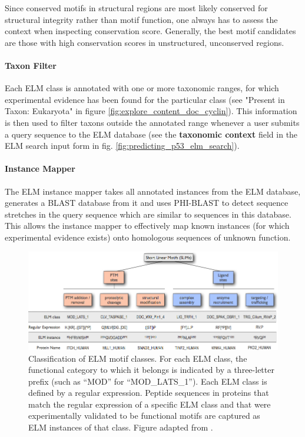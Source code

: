 \documentclass[12pt]{article}
\newcommand\button[1]{%
	\textbf{#1}%
}
\begin{document}
Since conserved motifs in structural regions are most likely conserved for
structural integrity rather than motif function, one always has to assess the
context when inspecting conservation score. Generally, the best motif candidates
are those with high conservation scores in unstructured, unconserved
regions.


\paragraph*{Taxon Filter}\label{TaxonFilter}

Each ELM class is annotated with one or more taxonomic ranges, for which
experimental evidence has been found for the particular class
(see "Present in Taxon: Eukaryota" in figure
\ref{fig:explore_content_doc_cyclin}). This information is then used to filter taxons
outside the annotated range whenever a user submits a query sequence to the ELM
database (see the \button{taxonomic context} field in the ELM search input form in fig.
\ref{fig:predicting_p53_elm_search}).

\paragraph*{Instance Mapper}\label{InstanceMapper}

The ELM instance mapper takes all annotated instances from the ELM database,
generates a BLAST database from it and uses PHI-BLAST \citep{9705509}
to detect sequence stretches in
the query sequence which are similar to sequences in this database. This allows
the instance mapper to effectively map known instances (for which experimental
evidence exists) onto homologous sequences of unknown function.

\begin{figure}[h!]
\centering
\includegraphics[width=\textwidth]{Figures/36_functional_classification_of_SLiMs.png}
\caption{
Classification of ELM motif classes.
For each ELM class, the functional category to which it belongs is indicated by
a three-letter prefix (such as ``MOD'' for ``MOD\_LATS\_1'').
Each ELM class is defined by a regular expression. Peptide sequences in
proteins that match the regular expression of a specific ELM class and that
were experimentally validated to be functional motifs are captured as ELM
instances of that class.
Figure adapted from \cite{24773235}.
}
\label{fig:SLiMclasses}
\end{figure}
\end{document}
